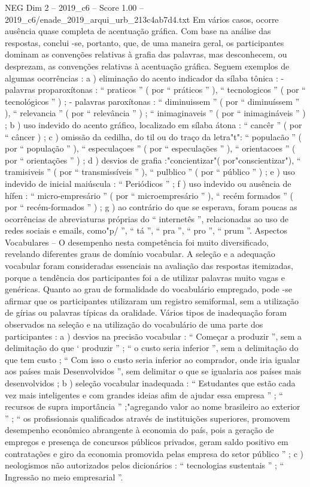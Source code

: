 \begin{textsample}{NEG Dim 2 – 2019\_c6 – Score 1.00 – 2019\_c6/enade\_2019\_arqui\_urb\_213c4ab7d4.txt}
Em vários casos, ocorre ausência quase completa de acentuação gráfica.
Com base na análise das respostas, conclui -se, portanto, que, de uma maneira geral, os participantes dominam as convenções relativas à grafia das palavras, mas desconhecem, ou desprezam, as convenções relativas à acentuação gráfica.
Seguem exemplos de algumas ocorrências : a ) eliminação do acento indicador da sílaba tônica : - palavras proparoxítonas : “ praticos ” ( por “ práticos ” ), “ tecnologicos ” ( por “ tecnológicos ” ) ; - palavras paroxítonas : “ diminuissem ” ( por “ diminuíssem ” ), “ relevancia ” ( por “ relevância ” ) ; “ inimaginaveis ” ( por “ inimagináveis ” ) ; b ) uso indevido do acento gráfico, localizado em sílaba átona : “ cancêr ” ( por “ câncer ) ; c ) omissão da cedilha, do til ou do traço da letra"t": “ populacão ” ( por “ população ” ), “ especulaçoes ” ( por “ especulações ” ), “ orientacoes ” ( por “ orientações ” ) ; d ) desvios de grafia :"concientizar"( por"conscientizar"), “ tramisiveis ” ( por “ transmissíveis ” ), “ pulblico ” ( por “ público ” ) ; e ) uso indevido de inicial maiúscula : “ Periódicos ” ; f ) uso indevido ou ausência de hífen : “ micro-empresário ” ( por “ microempresário ” ), “ recém formados ” ( por “ recém-formados ” ) ; g ) ao contrário do que se esperava, foram poucas as ocorrências de abreviaturas próprias do “ internetês ”, relacionadas ao uso de redes sociais e emails, como"p/ ”, “ tá ”, “ pra ”, “ pro ”, “ prum ”.
Aspectos Vocabulares – O desempenho nesta competência foi muito diversificado, revelando diferentes graus de domínio vocabular.
A seleção e a adequação vocabular foram consideradas essenciais na avaliação das respostas itemizadas, porque a tendência dos participantes foi a de utilizar palavras muito vagas e genéricas.
Quanto ao grau de formalidade do vocabulário empregado, pode -se afirmar que os participantes utilizaram um registro semiformal, sem a utilização de gírias ou palavras típicas da oralidade.
Vários tipos de inadequação foram observados na seleção e na utilização do vocabulário de uma parte dos participantes : a ) desvios na precisão vocabular : “ Começar a produzir ”, sem a delimitação do que ‘ produzir ” ; “ o custo seria inferior ”, sem a delimitação do que tem custo ; “ Com isso o custo seria inferior ao comprador, onde iria igualar aos países mais Desenvolvidos ”, sem delimitar o que se igualaria aos países mais desenvolvidos ; b ) seleção vocabular inadequada : “ Estudantes que estão cada vez mais inteligentes e com grandes ideias afim de ajudar essa empresa ” ; “ recursos de supra importância ” ;"agregando valor ao nome brasileiro ao exterior ” ; “ os profissionais qualificados através de instituições superiores, promovem desempenho econômico abrangente à economia do país, pois a geração de empregos e presença de concursos públicos privados, geram saldo positivo em contratações e giro da economia promovida pelas empresa do setor público ” ; c ) neologismos não autorizados pelos dicionários : “ tecnologias sustentais ” ; “ Ingressão no meio empresarial ”.

\end{textsample}
